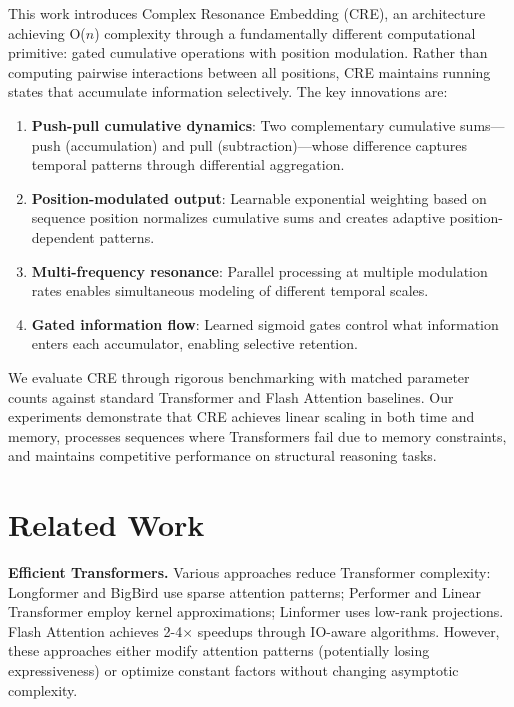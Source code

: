 \documentclass{article}
\begin{document}
This work introduces Complex Resonance Embedding (CRE), an architecture achieving O($n$) complexity through a fundamentally different computational primitive: gated cumulative operations with position modulation. Rather than computing pairwise interactions between all positions, CRE maintains running states that accumulate information selectively. The key innovations are:

\begin{enumerate}
\item \textbf{Push-pull cumulative dynamics}: Two complementary cumulative sums---push (accumulation) and pull (subtraction)---whose difference captures temporal patterns through differential aggregation.

\item \textbf{Position-modulated output}: Learnable exponential weighting based on sequence position normalizes cumulative sums and creates adaptive position-dependent patterns.

\item \textbf{Multi-frequency resonance}: Parallel processing at multiple modulation rates enables simultaneous modeling of different temporal scales.

\item \textbf{Gated information flow}: Learned sigmoid gates control what information enters each accumulator, enabling selective retention.
\end{enumerate}

We evaluate CRE through rigorous benchmarking with matched parameter counts against standard Transformer and Flash Attention baselines. Our experiments demonstrate that CRE achieves linear scaling in both time and memory, processes sequences where Transformers fail due to memory constraints, and maintains competitive performance on structural reasoning tasks.

\section{Related Work}

\textbf{Efficient Transformers.} Various approaches reduce Transformer complexity: Longformer \citep{beltagy2020longformer} and BigBird \citep{zaheer2020bigbird} use sparse attention patterns; Performer \citep{choromanski2021performer} and Linear Transformer \citep{katharopoulos2020transformers} employ kernel approximations; Linformer \citep{wang2020linformer} uses low-rank projections. Flash Attention \citep{dao2022flashattention} achieves 2-4$\times$ speedups through IO-aware algorithms. However, these approaches either modify attention patterns (potentially losing expressiveness) or optimize constant factors without changing asymptotic complexity.
\end{document}
